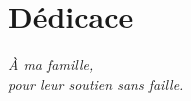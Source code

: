 \chapter*{Dédicace}


\vspace{3cm}
\begin{center}
\textit{À ma famille,}\\[0.3cm]
\textit{pour leur soutien sans faille.}
\end{center}
